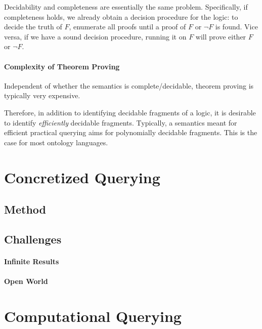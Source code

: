 Decidability and completeness are essentially the same problem.
Specifically, if completeness holds, we already obtain a decision procedure for the logic: to decide the truth of $F$, enumerate all proofs until a proof of $F$ or $\neg F$ is found.
Vice versa, if we have a sound decision procedure, running it on $F$ will prove either $F$ or $\neg F$.

\paragraph{Complexity of Theorem Proving}
Independent of whether the semantics is complete/decidable, theorem proving is typically very expensive.

Therefore, in addition to identifying decidable fragments of a logic, it is desirable to identify \emph{efficiently} decidable fragments.
Typically, a semantics meant for efficient practical querying aims for polynomially decidable fragments.
This is the case for most ontology languages.

\section{Concretized Querying}\label{sec:bolquery:conc}

\subsection{Method}

\subsection{Challenges}

\paragraph{Infinite Results}

\paragraph{Open World}

\section{Computational Querying}\label{sec:bolquery:comp}

